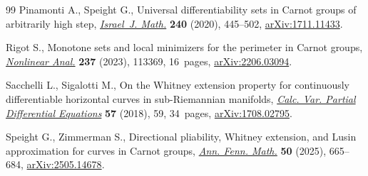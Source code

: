 \begin{thebibliography}{99}
Pinamonti A., Speight G., Universal differentiability sets in {C}arnot groups
 of arbitrarily high step,
 \href{https://doi.org/10.1007/s11856-020-2069-x}{\textit{Israel~J. Math.}}
 \textbf{240} (2020), 445--502,
 \href{http://arxiv.org/abs/1711.11433}{arXiv:1711.11433}.

Rigot S., Monotone sets and local minimizers for the perimeter in {C}arnot
 groups, \href{https://doi.org/10.1016/j.na.2023.113369}{\textit{Nonlinear
 Anal.}} \textbf{237} (2023), 113369, 16~pages,
 \href{http://arxiv.org/abs/2206.03094}{arXiv:2206.03094}.

Sacchelli L., Sigalotti M., On the {W}hitney extension property for
 continuously differentiable horizontal curves in sub-{R}iemannian manifolds,
 \href{https://doi.org/10.1007/s00526-018-1336-8}{\textit{Calc. Var. Partial
 Differential Equations}} \textbf{57} (2018), 59, 34~pages,
 \href{http://arxiv.org/abs/1708.02795}{arXiv:1708.02795}.

Speight G., Zimmerman S., Directional pliability, {W}hitney extension, and
 {L}usin approximation for curves in {C}arnot groups,
 \href{https://doi.org/10.54330/afm.176524}{\textit{Ann. Fenn. Math.}}
 \textbf{50} (2025), 665--684,
 \href{http://arxiv.org/abs/2505.14678}{arXiv:2505.14678}.

\end{thebibliography}
